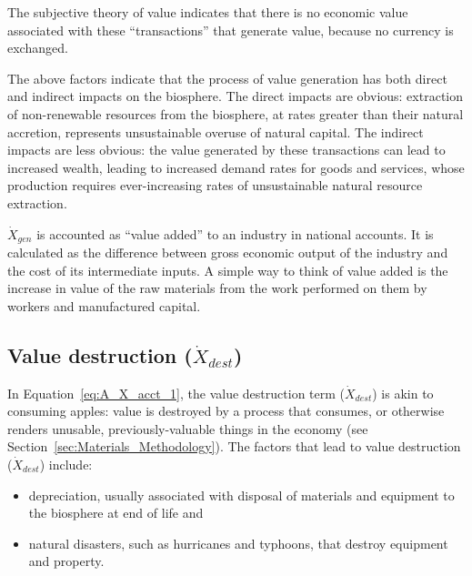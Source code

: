 
\noindent{}The subjective theory of value indicates that 
there is no economic value associated with these ``transactions''
that generate value, because no currency is exchanged. 

The above factors indicate that the process of value generation
has both direct and indirect impacts on the biosphere.
The direct impacts are obvious: 
extraction of non-renewable resources from the biosphere, 
at rates greater than their natural accretion,
represents unsustainable overuse of natural capital.
The indirect impacts are less obvious: 
the value generated by these transactions can lead to increased wealth,
leading to increased demand rates for goods and services, 
whose production requires ever-increasing rates 
of unsustainable natural resource extraction.

$\dot{X}_{gen}$ is accounted as ``value added'' to an industry in national accounts.
It is calculated as the difference between gross economic output of the industry
and the cost of its intermediate inputs.\cite{BEAVA}  
A simple way to think of value added is
the increase in value of the raw materials from the work performed 
on them by workers and manufactured capital.


\subsection{Value destruction ($\dot{X}_{dest}$)}

\noindent In Equation~\ref{eq:A_X_acct_1}, 
the value destruction term ($\dot{X}_{dest}$) 
is akin to consuming apples: 
value is destroyed by a process that consumes, 
or otherwise renders unusable, 
previously-valuable things in the economy
(see Section~\ref{sec:Materials_Methodology}).
The factors that lead to value destruction
($\dot{X}_{dest}$) include:

\begin{itemize}
	\item{depreciation, usually associated with disposal of 
	materials and equipment to the biosphere at end of life and}
	\item{natural disasters, such as hurricanes and typhoons,
	that destroy equipment and property.}
\end{itemize}

